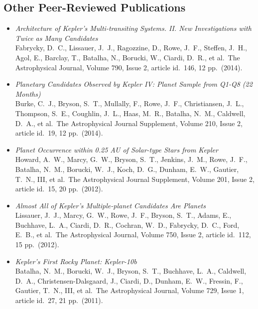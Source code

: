 \documentclass[12pt,letterpaper,sans]{moderncv} %
\begin{document}
\newpage
\subsection{Other Peer-Reviewed Publications}
\begin{itemize}
 \item \emph{ Architecture of Kepler's Multi-transiting Systems. II. New 
Investigations with Twice as Many Candidates } \\ Fabrycky, D.~C., 
Lissauer, J.~J., Ragozzine, D., Rowe, J.~F., Steffen, J.~H., Agol, E., 
Barclay, T., Batalha, N., Borucki, W., Ciardi, D.~R., et al.\ The 
Astrophysical Journal, Volume 790, Issue 2, article id.~146, 12
pp.~(2014).\ \\ 

 \item \emph{ Planetary Candidates Observed by Kepler IV: Planet Sample 
from Q1-Q8 (22 Months) } \\ Burke, C.~J., Bryson, S.~T., Mullally, F., 
Rowe, J.~F., Christiansen, J.~L., Thompson, S.~E., Coughlin, J.~L., Haas, 
M.~R., Batalha, N.~M., Caldwell, D.~A., et al.\ The Astrophysical Journal 
Supplement, Volume 210, Issue 2, article id.~19, 12 pp.~(2014).\ \\ 

 \item \emph{ Planet Occurrence within 0.25 AU of Solar-type Stars from 
Kepler } \\ Howard, A.~W., Marcy, G.~W., Bryson, S.~T., Jenkins, J.~M., 
Rowe, J.~F., Batalha, N.~M., Borucki, W.~J., Koch, D.~G., Dunham, E.~W., 
Gautier, T.~N., III, et al.\ The Astrophysical Journal Supplement, Volume 
201, Issue 2, article id.~15, 20 pp.~(2012).\ \\ 


 \item \emph{ Almost All of Kepler's Multiple-planet Candidates Are 
Planets } \\ Lissauer, J.~J., Marcy, G.~W., Rowe, J.~F., Bryson, S.~T., 
Adams, E., Buchhave, L.~A., Ciardi, D.~R., Cochran, W.~D., Fabrycky, D.~C., 
Ford, E.~B., et al.\ The Astrophysical Journal, Volume 750, Issue 2, 
article id.~112, 15 pp.~(2012).\ \\ 

 \item \emph{ Kepler's First Rocky Planet: Kepler-10b } \\ Batalha, 
N.~M., Borucki, W.~J., Bryson, S.~T., Buchhave, L.~A., Caldwell, D.~A., 
Christensen-Dalsgaard, J., Ciardi, D., Dunham, E.~W., Fressin, F., Gautier, 
T.~N., III, et al.\ The Astrophysical Journal, Volume 729, Issue 1, article 
id.~27, 21 pp.~(2011).\ \\ 


\end{itemize}
\end{document}
